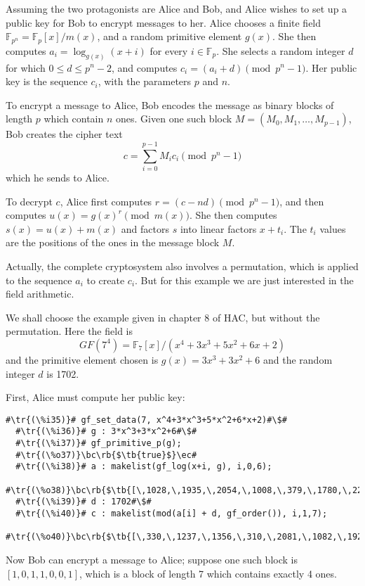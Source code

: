 \documentclass[a4paper,11pt,leqno,fleqn]{artikel3}
\newcommand{\bc}{\begin{center}}
\newcommand{\ec}{\end{center}}
\newcommand{\tr}[1]{\textcolor{red}{#1}}
\newcommand{\tb}[1]{\textcolor{blue}{#1}}
\newcommand{\rb}[1]{\raisebox{2mm}[0mm][1mm]{#1}}
\begin{document}
Assuming the two protagonists are Alice and Bob, and Alice wishes to set up a
public key for Bob to encrypt messages to her.  Alice chooses a finite field
$\mathbb{F}_{p^n}=\mathbb{F}_p[x]/m(x)$, and a random primitive element $g(x)$.  She
then computes $a_i=\log_{g(x)}(x+i)$ for every $i\in\mathbb{F}_p$.  She
selects a random integer $d$ for which $0\le d\le p^n-2$, and computes
$c_i=(a_i+d)\pmod{p^n-1}$.  Her public key is the sequence $c_i$, with the
parameters $p$ and $n$.

To encrypt a message to Alice, Bob encodes the message as binary blocks of
length $p$ which contain $n$ ones.  Given one such block
$M=(M_0,M_1,\ldots,M_{p-1})$, Bob creates the cipher text
\[
c=\sum_{i=0}^{p-1}M_ic_i\pmod{p^n-1}
\]
which he sends to Alice.

To decrypt $c$, Alice first computes $r=(c-nd)\pmod{p^n-1}$, and then computes
$u(x)=g(x)^r\pmod{m(x)}$.  She then computes $s(x)=u(x)+m(x)$ and factors $s$
into linear factors $x+t_i$.  The $t_i$ values are the positions of the ones
in the message block $M$.

Actually, the complete cryptosystem also involves a permutation, which is
applied to the sequence $a_i$ to create $c_i$.  But for this example we are
just interested in the field arithmetic.

We shall choose the example given in chapter 8 of HAC, but without the
permutation.  Here the field is
\[
GF(7^4)=\mathbb{F}_7[x]/(x^4+3x^3+5x^2+6x+2)
\]
and the primitive element chosen is $g(x)=3x^3+3x^2+6$ and the random integer
$d$ is 1702.

First, Alice must compute her public key:

\vspace*{2mm}
\begin{lstlisting}[escapechar=\#]
  #\tr{(\%i35)}# gf_set_data(7, x^4+3*x^3+5*x^2+6*x+2)#\$#
  #\tr{(\%i36)}# g : 3*x^3+3*x^2+6#\$#
  #\tr{(\%i37)}# gf_primitive_p(g);
  #\tr{(\%o37)}\bc\rb{$\tb{true}$}\ec#
  #\tr{(\%i38)}# a : makelist(gf_log(x+i, g), i,0,6);
  #\tr{(\%o38)}\bc\rb{$\tb{[\,1028,\,1935,\,2054,\,1008,\,379,\,1780,\,223\,]}$}\ec#
  #\tr{(\%i39)}# d : 1702#\$#
  #\tr{(\%i40)}# c : makelist(mod(a[i] + d, gf_order()), i,1,7);
  #\tr{(\%o40)}\bc\rb{$\tb{[\,330,\,1237,\,1356,\,310,\,2081,\,1082,\,1925\,]}$}\ec#
\end{lstlisting}

Now Bob can encrypt a message to Alice; suppose one such block is
$[1,0,1,1,0,0,1]$, which is a block of length 7 which contains exactly 4 ones.
\end{document}
